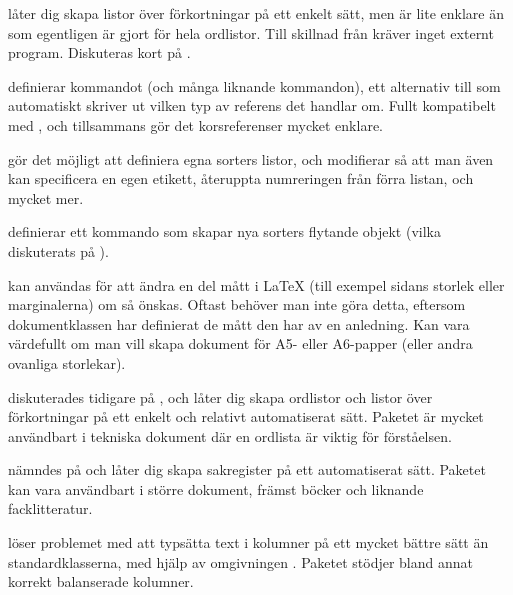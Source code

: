 \documentclass[10pt,../../a4.tex]{subfiles}
\begin{document}
\begin{description}
	\item[\pack{acro}]
	låter dig skapa listor över förkortningar på ett enkelt sätt, men är
	lite enklare än  som egentligen är gjort för hela
	ordlistor. Till skillnad från  kräver 
	inget externt program. Diskuteras kort på .

	\item[\pack{cleveref}]
	definierar kommandot  (och många liknande kommandon), ett
	alternativ till  som automatiskt skriver ut vilken typ av
	referens det handlar om. Fullt kompatibelt med , och
	tillsammans gör det korsreferenser mycket enklare.

	\item[\pack{enumitem}]
	gör det möjligt att definiera egna sorters listor, och modifierar 
		så att man även kan specificera en egen etikett, återuppta
	numreringen från förra listan, och mycket mer.
	
	\item[\pack{float}]
	definierar ett kommando  som skapar nya sorters flytande
	objekt (vilka diskuterats på ).
	
	\item[\pack{geometry}]
	kan användas för att ändra en del mått i \LaTeX{} (till exempel sidans
	storlek eller marginalerna) om så önskas. Oftast behöver man inte göra
	detta, eftersom dokumentklassen har definierat de mått den har av en
	anledning. Kan vara värdefullt om man vill skapa dokument för A5-%
	eller A6-papper (eller andra ovanliga storlekar).

	\item[\pack{glossaries}]
	diskuterades tidigare på , och låter
	dig skapa ordlistor och listor över förkortningar på ett enkelt
	och relativt automatiserat sätt. Paketet är mycket användbart i
	tekniska dokument där en ordlista är viktig för förståelsen.

	\item[\pack{imakeidx}]
	nämndes på  och låter dig skapa sakregister
	på ett automatiserat sätt. Paketet kan vara användbart i större
	dokument, främst böcker och liknande facklitteratur.

 	\item[\pack{multicol}]
 	löser problemet med att typsätta text i kolumner på ett mycket bättre
 	sätt än standardklasserna, med hjälp av omgivningen .
 	Paketet stödjer bland annat korrekt balanserade kolumner.
 	

\end{description}
\end{document}
